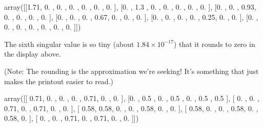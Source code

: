 \documentclass[letterpaper,10pt,english]{jupyterBook}
\begin{document}
\begin{sphinxVerbatim}[commandchars=\\\{\}]
     
   
     
\end{sphinxVerbatim}

\begin{sphinxVerbatim}[commandchars=\\\{\}]
array([[1.71, 0.  , 0.  , 0.  , 0.  , 0.  , 0.  ],
       [0.  , 1.3 , 0.  , 0.  , 0.  , 0.  , 0.  ],
       [0.  , 0.  , 0.93, 0.  , 0.  , 0.  , 0.  ],
       [0.  , 0.  , 0.  , 0.67, 0.  , 0.  , 0.  ],
       [0.  , 0.  , 0.  , 0.  , 0.25, 0.  , 0.  ],
       [0.  , 0.  , 0.  , 0.  , 0.  , 0.  , 0.  ]])
\end{sphinxVerbatim}

\sphinxAtStartPar
The sixth singular value is so tiny (about \(1.84\times10^{-17}\)) that it rounds to zero in the display above.

\sphinxAtStartPar
(Note: The rounding is  the approximation we’re seeking!  It’s something that just makes the printout easier to read.)

\begin{sphinxVerbatim}[commandchars=\\\{\}]
       
\end{sphinxVerbatim}

\begin{sphinxVerbatim}[commandchars=\\\{\}]
array([[ 0.71, \PYGZhy{}0.  ,  0.  ,  0.  ,  0.71, \PYGZhy{}0.  , \PYGZhy{}0.  ],
       [\PYGZhy{}0.  ,  0.5 , \PYGZhy{}0.  ,  0.5 ,  0.  ,  0.5 ,  0.5 ],
       [ 0.  , \PYGZhy{}0.  ,  0.71, \PYGZhy{}0.  ,  0.71,  0.  , \PYGZhy{}0.  ],
       [ 0.58,  0.58, \PYGZhy{}0.  ,  0.  ,  0.58, \PYGZhy{}0.  ,  0.  ],
       [ 0.58, \PYGZhy{}0.  , \PYGZhy{}0.  ,  0.58, \PYGZhy{}0.  ,  0.58,  0.  ],
       [ 0.  , \PYGZhy{}0.  ,  0.71, \PYGZhy{}0.  ,  0.71, \PYGZhy{}0.  , \PYGZhy{}0.  ]])
\end{sphinxVerbatim}
\end{document}
